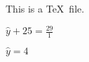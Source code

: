 \documentclass{article}
\begin{document}
This is a \TeX\  file.


$\hat{y}+25=\frac{29}{1}$

$\hat{y} = 4$
\end{document}
